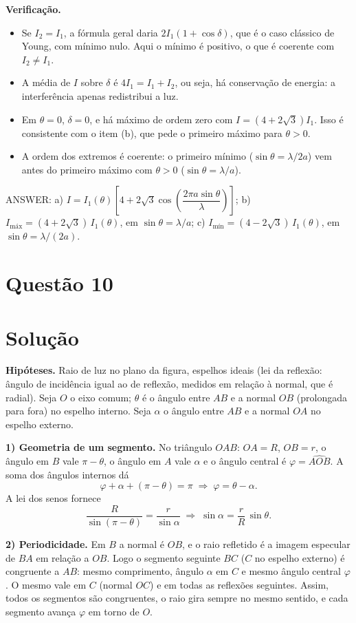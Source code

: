 \documentclass{article}%
\begin{document}
\textbf{Verificação.}
\begin{itemize}
\item Se $I_2=I_1$, a fórmula geral daria $2I_1(1+\cos\delta)$, que é o caso clássico de Young, com mínimo nulo. Aqui o mínimo é positivo, o que é coerente com $I_2\neq I_1$.
\item A média de $I$ sobre $\delta$ é $4I_1=I_1+I_2$, ou seja, há conservação de energia: a interferência apenas redistribui a luz.
\item Em $\theta=0$, $\delta=0$, e há máximo de ordem zero com $I=(4+2\sqrt3)I_1$. Isso é consistente com o item (b), que pede o primeiro máximo para $\theta>0$.
\item A ordem dos extremos é coerente: o primeiro mínimo ($\sin\theta=\lambda/2a$) vem antes do primeiro máximo com $\theta>0$ ($\sin\theta=\lambda/a$).
\end{itemize}

ANSWER: a) $I=I_1(\theta)\left[4+2\sqrt3\cos\left(\dfrac{2\pi a\sin\theta}{\lambda}\right)\right]$; b) $I_{\text{máx}}=(4+2\sqrt3)\,I_1(\theta)$, em $\sin\theta=\lambda/a$; c) $I_{\text{mín}}=(4-2\sqrt3)\,I_1(\theta)$, em $\sin\theta=\lambda/(2a)$.%
\newpage%
\section*{Questão 10}

\section*{Solução}

\textbf{Hipóteses.} Raio de luz no plano da figura, espelhos ideais (lei da reflexão: ângulo de incidência igual ao de reflexão, medidos em relação à normal, que é radial). Seja $O$ o eixo comum; $\theta$ é o ângulo entre $AB$ e a normal $OB$ (prolongada para fora) no espelho interno. Seja $\alpha$ o ângulo entre $AB$ e a normal $OA$ no espelho externo.

\textbf{1) Geometria de um segmento.} No triângulo $OAB$: $OA=R$, $OB=r$, o ângulo em $B$ vale $\pi-\theta$, o ângulo em $A$ vale $\alpha$ e o ângulo central é $\varphi=\widehat{AOB}$. A soma dos ângulos internos dá
\[
\varphi+\alpha+(\pi-\theta)=\pi \;\Rightarrow\; \varphi=\theta-\alpha .
\]
A lei dos senos fornece
\[
\frac{R}{\sin(\pi-\theta)}=\frac{r}{\sin\alpha}\;\Rightarrow\;\sin\alpha=\frac{r}{R}\,\sin\theta .
\]

\textbf{2) Periodicidade.} Em $B$ a normal é $OB$, e o raio refletido é a imagem especular de $BA$ em relação a $OB$. Logo o segmento seguinte $BC$ ($C$ no espelho externo) é congruente a $AB$: mesmo comprimento, ângulo $\alpha$ em $C$ e mesmo ângulo central $\varphi$. O mesmo vale em $C$ (normal $OC$) e em todas as reflexões seguintes. Assim, todos os segmentos são congruentes, o raio gira sempre no mesmo sentido, e cada segmento avança $\varphi$ em torno de $O$.
\end{document}
